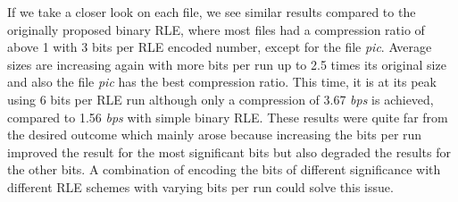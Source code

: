 \par{
If we take a closer look on each file, we see similar results compared to the originally proposed binary RLE, where most files had a compression ratio of above 1 with 3 bits per RLE encoded number, except for the file \textit{pic}. Average sizes are increasing again with more bits per run up to 2.5 times its original size and also the file \textit{pic} has the best compression ratio. This time, it is at its peak using 6 bits per RLE run although only a compression of 3.67 \textit{bps} is achieved, compared to 1.56 \textit{bps} with simple binary RLE. These results were quite far from the desired outcome which mainly arose because increasing the bits per run improved the result for the most significant bits but also degraded the results for the other bits. A combination of encoding the bits of different significance with different RLE schemes with varying bits per run could solve this issue.  
}

